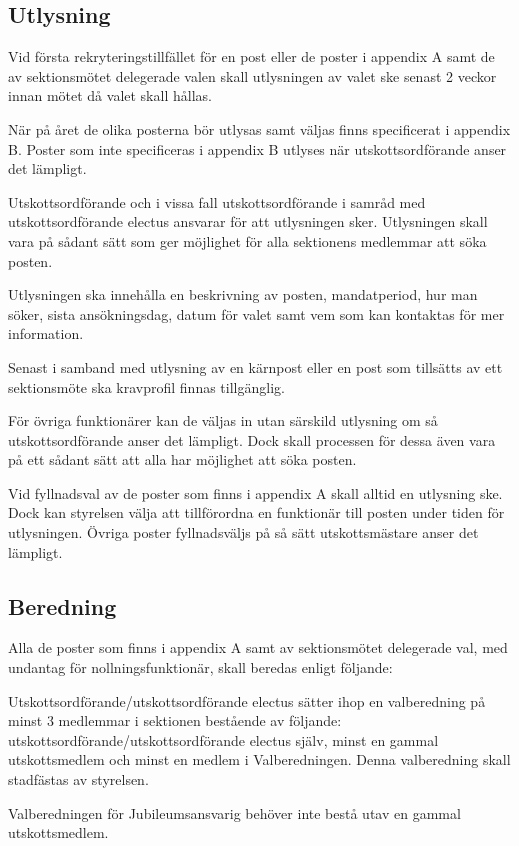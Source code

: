 \documentclass{dsekprotokoll}
\begin{document}
\subsection{Utlysning}
Vid första rekryteringstillfället för en post eller de poster i appendix A samt de av sektionsmötet delegerade valen skall utlysningen av valet ske senast 2 veckor innan mötet då valet skall hållas.

När på året de olika posterna bör utlysas samt väljas finns specificerat i appendix B. Poster som inte specificeras i appendix B utlyses när utskottsordförande anser det lämpligt.

Utskottsordförande och i vissa fall utskottsordförande i samråd med utskottsordförande electus ansvarar för att utlysningen sker. Utlysningen skall vara på sådant sätt som ger möjlighet för alla sektionens medlemmar att söka posten.

Utlysningen ska innehålla en beskrivning av posten, mandatperiod, hur man söker, sista ansökningsdag, datum för valet samt vem som kan kontaktas för mer information.

Senast i samband med utlysning av en kärnpost eller en post som tillsätts av ett sektionsmöte ska kravprofil finnas tillgänglig.

För övriga funktionärer kan de väljas in utan särskild utlysning om så utskottsordförande anser det lämpligt. Dock skall processen för dessa även vara på ett sådant sätt att alla har möjlighet att söka posten.

Vid fyllnadsval av de poster som finns i appendix A skall alltid en utlysning ske. Dock kan styrelsen välja att tillförordna en funktionär till posten under tiden för utlysningen. Övriga poster fyllnadsväljs på så sätt utskottsmästare anser det lämpligt.

\subsection{Beredning}

Alla de poster som finns i appendix A samt av sektionsmötet delegerade val, med undantag för nollningsfunktionär, skall beredas enligt följande:

Utskottsordförande/utskottsordförande electus sätter ihop en valberedning på minst 3 medlemmar i sektionen bestående av följande: utskottsordförande/utskottsordförande electus själv, minst en gammal utskottsmedlem och minst en medlem i Valberedningen. Denna valberedning skall stadfästas av styrelsen.

Valberedningen för Jubileumsansvarig behöver inte bestå utav en gammal utskottsmedlem.
\end{document}

